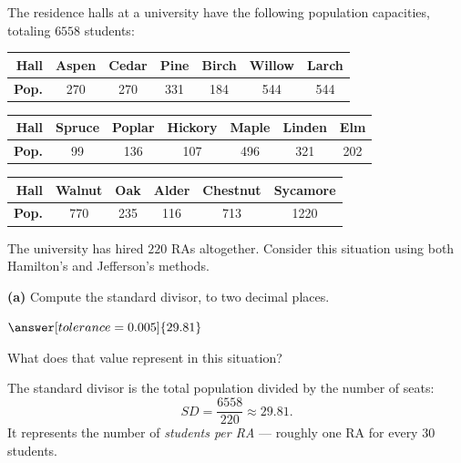 \documentclass[12pt]{ximera}
\begin{document}
\begin{problem}
The residence halls at a university have the following population capacities,
totaling $6558$ students:

\begin{center}
\begin{tabular}{r|c|c|c|c|c|c}
\textbf{Hall} & Aspen & Cedar & Pine & Birch & Willow & Larch \\\hline
\textbf{Pop.} & 270 & 270 & 331 & 184 & 544 & 544 \\
\end{tabular}

\smallskip
\begin{tabular}{r|c|c|c|c|c|c}
\textbf{Hall} & Spruce & Poplar & Hickory & Maple & Linden & Elm \\\hline
\textbf{Pop.} & 99 & 136 & 107 & 496 & 321 & 202 \\
\end{tabular}

\smallskip
\begin{tabular}{r|c|c|c|c|c}
\textbf{Hall} & Walnut & Oak & Alder & Chestnut & Sycamore \\\hline
\textbf{Pop.} & 770 & 235 & 116 & 713 & 1220 \\
\end{tabular}
\end{center}

The university has hired $220$ RAs altogether. Consider this situation using both
Hamilton's and Jefferson's methods.

\begin{prompt}
\textbf{(a)} Compute the standard divisor, to two decimal places.

$\answer[tolerance=0.005]{29.81}$

\smallskip
What does that value represent in this situation?
\begin{multipleChoice}
\end{multipleChoice}

\begin{feedback}
The standard divisor is the total population divided by the number of seats:
\[ SD = \frac{6558}{220} \approx 29.81. \]
It represents the number of \emph{students per RA} --- roughly one RA for every $30$
students.
\end{feedback}
\end{prompt}


\end{problem}
\end{document}
